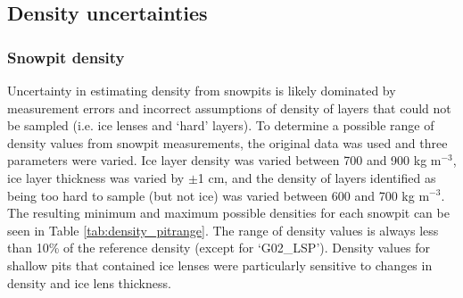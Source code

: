 \documentclass[12pt]{article}
\begin{document}
\subsection*{Density uncertainties}

\subsubsection*{Snowpit density}

Uncertainty in estimating density from snowpits is likely dominated by measurement errors and incorrect assumptions of density of layers that could not be sampled (i.e. ice lenses and `hard' layers). To determine a possible range of density values from snowpit measurements, the original data was used and three parameters were varied. Ice layer density was varied between 700 and 900 kg m$^{-3}$, ice layer thickness was varied by $\pm$1 cm, and the density of layers identified as being too hard to sample (but not ice) was varied between 600 and 700 kg m$^{-3}$. The resulting minimum and maximum possible densities for each snowpit can be seen in Table \ref{tab:density_pitrange}. The range of density values is always less than 10\% of the reference density (except for `G02\_LSP'). Density values for shallow pits that contained ice lenses were particularly sensitive to changes in density and ice lens thickness. 
\end{document}

